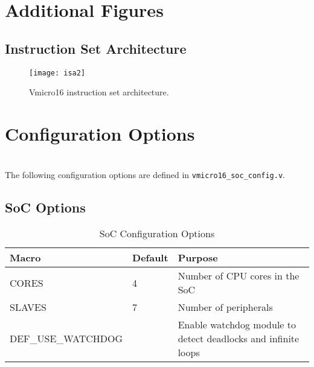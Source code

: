 \begin{appendices}
\startcontents[chapters]

\chapter{Additional Figures}
\section{Instruction Set Architecture}
\begin{figure}[H]
\centering
\texttt{[image: isa2]}
\caption{Vmicro16 instruction set architecture.}
\label{fig:isa}
\end{figure}

\chapter{Configuration Options}
\label{sect:config}
\startcontents[chapters]

\noindent\\
The following configuration options are defined in \verb|vmicro16_soc_config.v|.

\section{SoC Options}
\begin{table}[H]
\centering
\label{tab:isa}
\begin{tabularx}{\textwidth}{l|l|p{8cm}}
Macro      & Default & Purpose                         \\ 
\hline
CORES  & 4       & Number of CPU cores in the SoC  \\
SLAVES & 7       & Number of peripherals  \\    
DEF\_USE\_WATCHDOG &  & Enable watchdog module to detect deadlocks and infinite loops \\    
\end{tabularx}
\caption{SoC Configuration Options}
\end{table}


\end{appendices}

